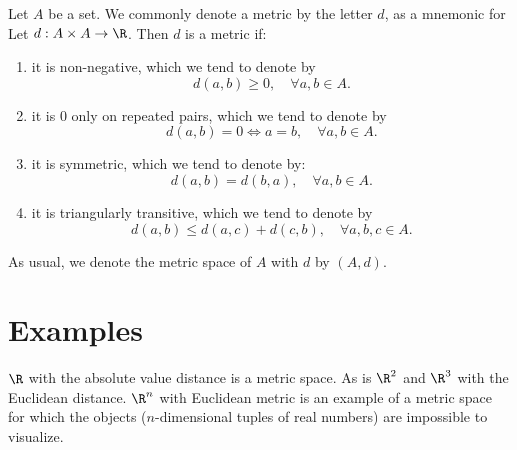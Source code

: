 Let $A$ be a set.
We commonly denote a metric by the letter $d$, as a mnemonic for 
Let $d: A \times  A \to \R $.
Then $d$ is a metric if:
  \begin{enumerate}
  \item it is non-negative, which we tend to denote by
      \[
d(a, b) \geq 0, \quad \forall a,b \in A.
      \]
  \item it is $0$ only on repeated pairs, which we tend to denote by
      \[
d(a, b) = 0 \iff a = b, \quad \forall a,b \in A.
      \]
  \item it is symmetric, which we tend to denote by:
      \[
d(a, b) = d(b, a), \quad \forall a,b \in A.
      \]
  \item it is triangularly transitive, which we tend to denote by
      \[
d(a, b) \leq d(a, c) + d(c, b), \quad \forall a,b,c \in A.
      \]
  \end{enumerate}
As usual, we denote the metric space of $A$ with $d$ by $(A, d)$.

\section*{Examples}

$\R $ with the absolute value distance is a metric space.
As is $\R ^2$ and $\R ^3$ with the Euclidean distance.
$\R ^n$ with Euclidean metric is an example of a metric space for which the objects ($n$-dimensional tuples of real numbers) are impossible to visualize.

